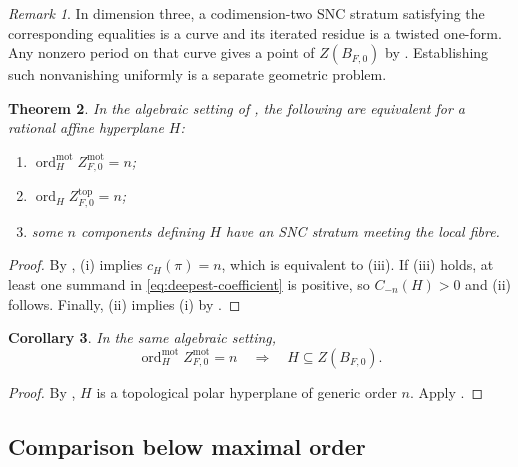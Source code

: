 \documentclass[12pt]{amsart}
\numberwithin{equation}{section}
\theoremstyle{plain}
\newtheorem{theorem}{Theorem}[section]
\newtheorem{corollary}[theorem]{Corollary}
\theoremstyle{definition}
\theoremstyle{remark}
\newtheorem{remark}[theorem]{Remark}
\theoremstyle{definition}
\DeclareMathOperator{\ord}{ord}
\begin{document}
\begin{remark}
In dimension three, a codimension-two SNC stratum satisfying the corresponding equalities is a curve and its iterated residue is a twisted one-form. Any nonzero period on that curve gives a point of $Z(B_{F,0})$ by . Establishing such nonvanishing uniformly is a separate geometric problem.
\end{remark}

\begin{theorem}\label{thm:maximal-motivic-equivalence}
In the algebraic setting of , the following are equivalent for a rational affine hyperplane $H$:
\begin{enumerate}[label=\textup{(\roman*)}]
\item $\ord_H^{\mathrm{mot}}Z^{\mathrm{mot}}_{F,0}=n$;
\item $\ord_HZ^{\mathrm{top}}_{F,0}=n$;
\item some $n$ components defining $H$ have an SNC stratum meeting the local fibre.
\end{enumerate}
\end{theorem}

\begin{proof}
By , (i) implies $c_H(\pi)=n$, which is equivalent to (iii). If (iii) holds, at least one summand in \eqref{eq:deepest-coefficient} is positive, so $C_{-n}(H)>0$ and (ii) follows. Finally, (ii) implies (i) by .
\end{proof}


\begin{corollary}\label{cor:maximal-motivic-smc}
In the same algebraic setting,
\begin{equation*}
\ord_H^{\mathrm{mot}}Z^{\mathrm{mot}}_{F,0}=n
 \quad\Longrightarrow \quad
 H\subseteq Z(B_{F,0}).
\end{equation*}
\end{corollary}

\begin{proof}
By , $H$ is a topological polar hyperplane of generic order $n$. Apply .
\end{proof}

\subsection{Comparison below maximal order}
\end{document}
